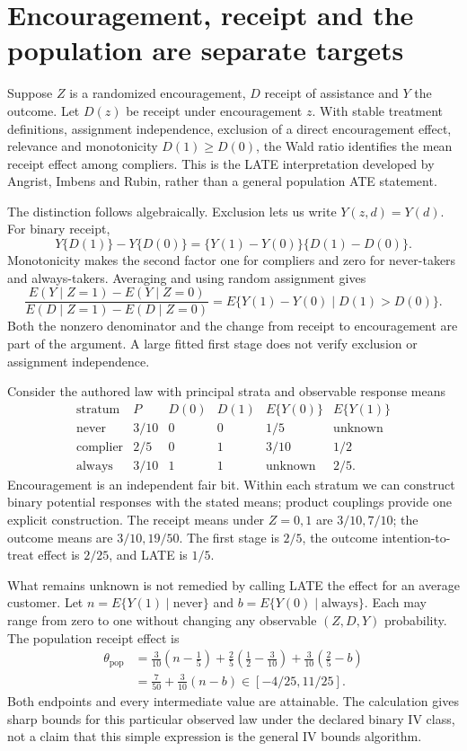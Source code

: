 \section{Encouragement, receipt and the population are separate targets}
\label{exec17:s3-iv}

Suppose $Z$ is a randomized encouragement, $D$ receipt of assistance
and $Y$ the outcome. Let $D(z)$ be receipt under encouragement
$z$. With stable treatment definitions, assignment independence,
exclusion of a direct encouragement effect, relevance and
monotonicity $D(1)\ge D(0)$, the Wald ratio identifies the mean
receipt effect among compliers. This is the LATE interpretation
developed by Angrist, Imbens and Rubin, rather than a general
population ATE statement.\citep{angrist1996}

The distinction follows algebraically. Exclusion lets us write
$Y(z,d)=Y(d)$. For binary receipt,
\[
 Y\{D(1)\}-Y\{D(0)\}
   =\{Y(1)-Y(0)\}\{D(1)-D(0)\}.
\]
Monotonicity makes the second factor one for compliers and zero
for never-takers and always-takers. Averaging and using
random assignment gives
\[
 \frac{E(Y\mid Z=1)-E(Y\mid Z=0)}
      {E(D\mid Z=1)-E(D\mid Z=0)}
 =E\{Y(1)-Y(0)\mid D(1)>D(0)\}.
\]
Both the nonzero denominator and the change from receipt to
encouragement are part of the argument. A large fitted first
stage does not verify exclusion or assignment
independence.\citep{angrist1996}

Consider the authored law with principal strata and observable
response means
\[
\begin{array}{c|c|cc|cc}
 \text{stratum}&P&D(0)&D(1)&E\{Y(0)\}&E\{Y(1)\}\\ \hline
 \text{never}&3/10&0&0&1/5&\text{unknown}\\
 \text{complier}&2/5&0&1&3/10&1/2\\
 \text{always}&3/10&1&1&\text{unknown}&2/5 .
\end{array}
\]
Encouragement is an independent fair bit. Within each stratum
we can construct binary potential responses with the stated
means; product couplings provide one explicit construction.
The receipt means under $Z=0,1$ are $3/10,7/10$;
the outcome means are $3/10,19/50$. The first stage is $2/5$,
the outcome intention-to-treat effect is $2/25$, and LATE is
$1/5$.\citep{exec17_s3_exact}

What remains unknown is not remedied by calling LATE the effect
for an average customer. Let $n=E\{Y(1)\mid\text{never}\}$
and $b=E\{Y(0)\mid\text{always}\}$. Each may range from zero
to one without changing any observable $(Z,D,Y)$ probability.
The population receipt effect is
\begin{align*}
 \theta_{\mathrm{pop}}
 &=\tfrac3{10}(n-\tfrac15)
   +\tfrac25(\tfrac12-\tfrac3{10})
   +\tfrac3{10}(\tfrac25-b)\\
 &=\tfrac7{50}+\tfrac3{10}(n-b)
   \in[-4/25,11/25].
\end{align*}
Both endpoints and every intermediate value are attainable.
The calculation gives sharp bounds for this particular observed
law under the declared binary IV class, not a claim that this
simple expression is the general IV bounds algorithm.

